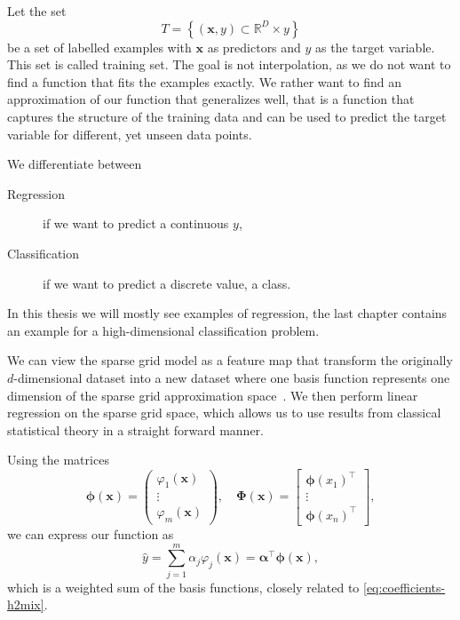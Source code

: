 Let the set 
\begin{equation*}
T = \left\{ \left(  \bm{x}, y \right) \subset \mathbb{R}^D \times y \right\} 
\end{equation*}
be a set of labelled examples with \(\bm{x}\) as predictors and \(y\) as the target variable. 
This set is called training set.
The goal is not interpolation, as we do not want to find a function that fits the examples exactly.
We rather want to find an approximation of our function that generalizes well,
that is a function that captures the structure of the training data and can be
used to predict the target variable for different, yet unseen data points.

We differentiate between
\begin{description}
\item[Regression] if we want to predict a continuous \(y\),
\item[Classification] if we want to predict a discrete value, a class.
\end{description}
In this thesis we will mostly see examples of regression, the last chapter
contains an example for a high-dimensional classification problem.

We can view the sparse grid model as a feature map that transform the originally
\(d\)-dimensional dataset into a new dataset where one basis function represents
one dimension of the sparse grid approximation space~\cite{sparse-parsimony}.
We then perform linear regression on the sparse grid space, which allows us to use results from classical statistical
theory in a straight forward manner.

Using the matrices
\begin{equation*}
\boldsymbol{\phi}(\boldsymbol{x}) = \begin{pmatrix}
  \varphi_1(\bm{x}) \\
  \vdots \\
  \varphi_m(\bm{x})
\end{pmatrix}
, \quad
\boldsymbol{\Phi}(\boldsymbol{x}) = \begin{bmatrix}
  \boldsymbol{\phi}(x_1)^\intercal\\
  \vdots \\
  \boldsymbol{\phi}(x_n)^\intercal
\end{bmatrix},
\end{equation*}
we can express our function as
\begin{equation*}
\hat{y} = \sum_{j = 1}^m \alpha_j \varphi_{j}(\bm{x}) = \boldsymbol{\alpha}^\intercal \bm{\phi} (\bm{x}),
\end{equation*}
which is a weighted sum of the basis functions, closely related to \cref{eq:coefficients-h2mix}.

